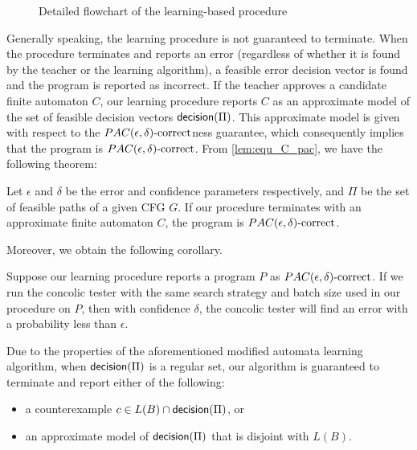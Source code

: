 \begin{figure}[hb]
	\caption{Detailed flowchart of the learning-based procedure}
	\label{figure:learning}
\end{figure}

Generally speaking, the learning procedure is not guaranteed to terminate. When the procedure terminates and reports an error (regardless of whether it is found by the teacher or the learning algorithm), a feasible error decision vector is found and the program is reported as incorrect. If the teacher approves a candidate finite automaton $C$, our learning procedure reports $C$ as an approximate model of the set of feasible decision vectors $\mathsf{decision}(\Pi)$. This approximate model is given with respect to the $PAC(\epsilon, \delta)\text{-correct}$ness guarantee, which consequently implies that the program is $PAC(\epsilon, \delta)\text{-correct}$. From \ref{lem:equ_C_pac}, we have the following theorem:

\begin{theorem}
	Let $\epsilon$ and $\delta$ be the error and confidence parameters respectively, and $\Pi$ be the set of feasible paths of a given CFG $G$. If our procedure terminates with an approximate finite automaton $C$, the program is $PAC(\epsilon, \delta)\text{-correct}$. 
\end{theorem}

Moreover, we obtain the following corollary.

\begin{corollary}
	Suppose our learning procedure reports a program $P$ as $PAC(\epsilon, \delta)\text{-correct}$. If we run the concolic tester with the same search strategy and batch size used in our procedure on $P$, then with confidence $\delta$, the concolic tester will find an error with a probability less than $\epsilon$. 
\end{corollary}

Due to the properties of the aforementioned modified automata learning algorithm, when $\mathsf{decision}(\Pi)$ is a regular set, our algorithm is guaranteed to terminate and report either of the following:
\begin{itemize}
	\item a counterexample $c \in L(B) \cap \mathsf{decision}(\Pi)$, or
	\item an approximate model of $\mathsf{decision}(\Pi)$ that is disjoint with $L(B)$.
\end{itemize}